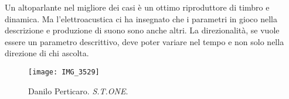Un altoparlante nel migliore dei casi è un ottimo riproduttore di timbro e dinamica.
Ma l'elettroacustica ci ha insegnato che i parametri in gioco nella descrizione e
produzione di suono sono anche altri. La direzionalità, se vuole essere un parametro descrittivo,
deve poter variare nel tempo e non solo nella direzione di chi ascolta.

\vfill

\begin{figure}[h]
\centering
{\texttt{[image: IMG\_3529]}}
\caption[Danilo Perticaro. \emph{S.T.ONE}.]{Danilo Perticaro. \emph{S.T.ONE}.}
\label{fig:dpstone}
\end{figure}
